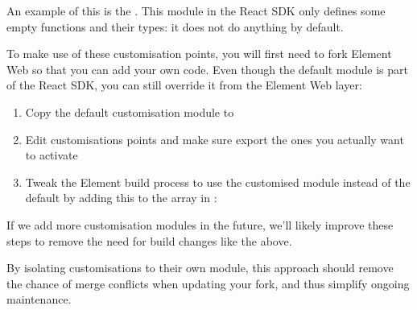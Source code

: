 \documentclass[letterpaper,10pt,openany,oneside,english]{sphinxmanual}
\begin{document}
\sphinxAtStartPar
An example of this is the .
This module in the React SDK only defines some empty functions and their types:
it does not do anything by default.

\sphinxAtStartPar
To make use of these customisation points, you will first need to fork Element
Web so that you can add your own code. Even though the default module is part of
the React SDK, you can still override it from the Element Web layer:
\begin{enumerate}
%
\item {} 
\sphinxAtStartPar
Copy the default customisation module to

\item {} 
\sphinxAtStartPar
Edit customisations points and make sure export the ones you actually want to
activate

\item {} 
\sphinxAtStartPar
Tweak the Element build process to use the customised module instead of the
default by adding this to the  array in :

\end{enumerate}

\begin{sphinxVerbatim}[commandchars=\\\{\}]
 
     
\end{sphinxVerbatim}

\sphinxAtStartPar
If we add more customisation modules in the future, we’ll likely improve these
steps to remove the need for build changes like the above.

\sphinxAtStartPar
By isolating customisations to their own module, this approach should remove the
chance of merge conflicts when updating your fork, and thus simplify ongoing
maintenance.
\end{document}
